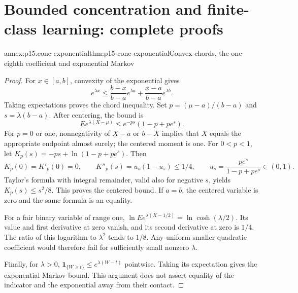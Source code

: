 \section{Bounded concentration and finite-class learning: complete proofs}
\label{sec:annex-p15-bounded-concentration-learning}

\begin{annexitem}{annex:p15.conc-exponential}{thm:p15-conc-exponential}{Convex chords, the one-eighth coefficient and exponential Markov}
\begin{proof}
For \(x\in[a,b]\), convexity of the exponential gives
\[
 e^{\lambda x}\leq
       \frac{b-x}{b-a}e^{\lambda a}
            +\frac{x-a}{b-a}e^{\lambda b}.
\]
Taking expectations proves the chord inequality. Set
\(p=(\mu-a)/(b-a)\) and \(s=\lambda(b-a)\).
After centering, the bound is
\[
 Ee^{\lambda(X-\mu)}
       \leq e^{-ps}(1-p+pe^s).
\]
For \(p=0\) or one, nonnegativity of \(X-a\) or \(b-X\)
implies that \(X\) equals the appropriate endpoint almost surely;
the centered moment is one. For \(0<p<1\), let
\(K_p(s)=-ps+\ln(1-p+pe^s)\). Then
\[
 K_p(0)=K'_p(0)=0,\qquad
 K''_p(s)=u_s(1-u_s)\leq1/4,\qquad
 u_s=\frac{pe^s}{1-p+pe^s}\in(0,1).
\]
Taylor's formula with integral remainder, valid also for
negative \(s\), yields \(K_p(s)\leq s^2/8\).
This proves the centered bound. If \(a=b\), the centered
variable is zero and the same formula is an equality.

For a fair binary variable of range one,
\(\ln Ee^{\lambda(X-1/2)}=\ln\cosh(\lambda/2)\).
Its value and first derivative at zero vanish, and its
second derivative at zero is \(1/4\). The ratio of this
logarithm to \(\lambda^2\) tends to \(1/8\).
Any uniform smaller quadratic coefficient would therefore
fail for sufficiently small nonzero \(\lambda\).

Finally, for \(\lambda>0\),
\(\mathbf1_{\{W\geq t\}}\leq e^{\lambda(W-t)}\)
pointwise. Taking its expectation gives the exponential
Markov bound. This argument does not assert equality of
the indicator and the exponential away from their contact.
\end{proof}
\end{annexitem}

